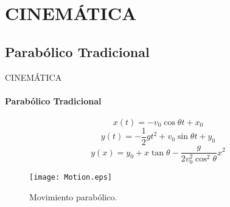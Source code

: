 \section{CINEMÁTICA}
\subsection{Parabólico Tradicional}
\begin{frame}{CINEMÁTICA}
	\framesubtitle{Parabólico Tradicional}
	\begin{equation}
	x\left( t \right)=-v_{0}\cos \theta t+x_{0}
	\end{equation}
    \begin{equation}
    y(t)=-\frac { 1 }{ 2 } g{ t }^{ 2 }+{ v }_{ 0 }\sin { \theta t+{ y }_{ 0 } }
    \end{equation}
    \begin{equation}
    y\left( x \right)=y_{0}+x\tan \theta -\frac{g}{2v_{0}^{2}\cos ^{2}\theta }x^2
    \end{equation}
	\begin{figure}[H]
  		\centering
  		\texttt{[image: Motion.eps]}
 		\caption{Movimiento parabólico.}
	\end{figure}
\end{frame}
